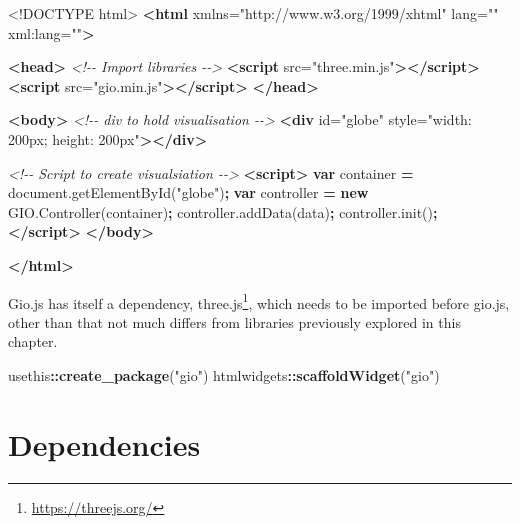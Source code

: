 \documentclass[
]{krantz}
\makeatletter
\newenvironment{Shaded}{\begin{snugshade}}{\end{snugshade}}
\newcommand{\AttributeTok}[1]{\textcolor[rgb]{0.61,0.61,0.61}{#1}}
\newcommand{\CommentTok}[1]{\textcolor[rgb]{0.37,0.37,0.37}{\textit{#1}}}
\newcommand{\DataTypeTok}[1]{\textcolor[rgb]{0.27,0.27,0.27}{#1}}
\newcommand{\KeywordTok}[1]{\textcolor[rgb]{0.27,0.27,0.27}{\textbf{#1}}}
\newcommand{\NormalTok}[1]{#1}
\newcommand{\OperatorTok}[1]{\textcolor[rgb]{0.43,0.43,0.43}{\textbf{#1}}}
\newcommand{\OtherTok}[1]{\textcolor[rgb]{0.37,0.37,0.37}{#1}}
\newcommand{\StringTok}[1]{\textcolor[rgb]{0.5,0.5,0.5}{#1}}
\newcommand{\VariableTok}[1]{\textcolor[rgb]{0,0,0}{#1}}
\renewcommand{\href}[2]{#2\footnote{\url{#1}}}
\newenvironment{kframe}{%
\medskip{}
\setlength{\fboxsep}{.8em}
 \def\at@end@of@kframe{}%
 \ifinner\ifhmode%
  \def\at@end@of@kframe{\end{minipage}}%
  \begin{minipage}{\columnwidth}%
 \fi\fi%
 \def\FrameCommand##1{\hskip\@totalleftmargin \hskip-\fboxsep
 \colorbox{shadecolor}{##1}\hskip-\fboxsep
     \hskip-\linewidth \hskip-\@totalleftmargin \hskip\columnwidth}%
 \MakeFramed {\advance\hsize-\width
   \@totalleftmargin\z@ \linewidth\hsize
   \@setminipage}}%
 {\par\unskip\endMakeFramed%
 \at@end@of@kframe}
\renewenvironment{Shaded}{\begin{kframe}}{\end{kframe}}
\makeatother
\begin{document}
\begin{Shaded}
\begin{Highlighting}[]
\DataTypeTok{<!DOCTYPE }\NormalTok{html}\DataTypeTok{>}
\KeywordTok{<html}\OtherTok{ xmlns=}\StringTok{"http://www.w3.org/1999/xhtml"}\OtherTok{ lang=}\StringTok{""}\OtherTok{ xml:lang=}\StringTok{""}\KeywordTok{>}

\KeywordTok{<head>}
  \CommentTok{<!{-}{-} Import libraries {-}{-}>}
  \KeywordTok{<script}\OtherTok{ src=}\StringTok{"three.min.js"}\KeywordTok{></script>}
  \KeywordTok{<script}\OtherTok{ src=}\StringTok{"gio.min.js"}\KeywordTok{></script>}
\KeywordTok{</head>}

\KeywordTok{<body>}
  \CommentTok{<!{-}{-} div to hold visualisation {-}{-}>}
  \KeywordTok{<div}\OtherTok{ id=}\StringTok{"globe"}\OtherTok{ style=}\StringTok{"width: 200px; height: 200px"}\KeywordTok{></div>}

  \CommentTok{<!{-}{-} Script to create visualsiation {-}{-}>}
  \KeywordTok{<script>}
    \KeywordTok{var}\NormalTok{ container }\OperatorTok{=} \VariableTok{document}\NormalTok{.}\AttributeTok{getElementById}\NormalTok{(}\StringTok{"globe"}\NormalTok{)}\OperatorTok{;}
    \KeywordTok{var}\NormalTok{ controller }\OperatorTok{=} \KeywordTok{new} \VariableTok{GIO}\NormalTok{.}\AttributeTok{Controller}\NormalTok{(container)}\OperatorTok{;}
    \VariableTok{controller}\NormalTok{.}\AttributeTok{addData}\NormalTok{(data)}\OperatorTok{;}
    \VariableTok{controller}\NormalTok{.}\AttributeTok{init}\NormalTok{()}\OperatorTok{;}
  \KeywordTok{</script>}
\KeywordTok{</body>}

\KeywordTok{</html>}
\end{Highlighting}
\end{Shaded}

Gio.js has itself a dependency, \href{https://threejs.org/}{three.js}, which needs to be imported before gio.js, other than that not much differs from libraries previously explored in this chapter.

\begin{Shaded}
\begin{Highlighting}[]
\NormalTok{usethis}\OperatorTok{::}\KeywordTok{create\_package}\NormalTok{(}\StringTok{"gio"}\NormalTok{)}
\NormalTok{htmlwidgets}\OperatorTok{::}\KeywordTok{scaffoldWidget}\NormalTok{(}\StringTok{"gio"}\NormalTok{)}
\end{Highlighting}
\end{Shaded}

\hypertarget{dependencies-1}{%
\section*{Dependencies}\label{dependencies-1}}
\end{document}
